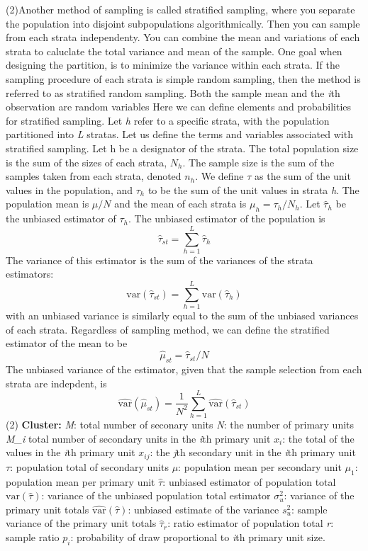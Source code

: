 \documentclass[12pt,twoside]{reedthesis}
\begin{document}
(2)Another method of sampling is called stratified sampling, where you separate the population into disjoint subpopulations algorithmically. Then you can sample from each strata independenty. You can combine the mean and variations of each strata to caluclate the total variance and mean of the sample. One goal when designing the partition, is to minimize the variance within each strata. If the sampling procedure of each strata is simple random sampling, then the method is referred to as stratified random sampling. Both the sample mean and the \emph{i}th observation are random variables
Here we can define elements and probabilities for stratified sampling. Let \emph{h} refer to a specific strata, with the population partitioned into \emph{L} stratas. Let us define the terms and variables associated with stratified sampling.
Let h be a designator of the strata. The total population size is the sum of the sizes of each strata, \(N_h\). The sample size is the sum of the samples taken from each strata, denoted \(n_h\). We define \(\tau\) as the sum of the unit values in the population, and \(\tau_h\) to be the sum of the unit values in strata \emph{h}. The population mean is \(\mu/N\) and the mean of each strata is \(\mu_h = \tau_h/N_h\).
Let \(\hat{\tau}_h\) be the unbiased estimator of \(\tau_h\). The unbiased estimator of the population is
\[ \hat{\tau}_{st} = \sum^L_{h=1}\hat{\tau}_h \]
The variance of this estimator is the sum of the variances of the strata estimators:
\[
\text{var}\left(\hat{\tau}_{st}\right) = \sum^L_{h=1}\text{var}\left(\hat{\tau}_h\right)
\]
with an unbiased variance is similarly equal to the sum of the unbiased variances of each strata.
Regardless of sampling method, we can define the stratified estimator of the mean to be
\[
\hat{\mu}_{st} = \hat{\tau}_{st}/N
\]
The unbiased variance of the estimator, given that the sample selection from each strata are indepdent, is
\[
\widehat{\text{var}} \left( \hat{\mu}_{st} \right) = \frac{1}{N^2} \sum^L_{h=1} \hat{\text{var}} \left(\hat{\tau}_{st}\right)
\]
(2)
\textbf{Cluster:}
\emph{M}: total number of seconary units
\emph{N}: the number of primary units
\emph{M\_i} total number of secondary units in the \emph{i}th primary unit
\(x_i\): the total of the values in the \emph{i}th primary unit
\(x_{ij}\): the \emph{j}th secondary unit in the \emph{i}th primary unit
\(\tau\): population total of secondary units
\(\mu\): population mean per secondary unit
\(\mu_1\): population mean per primary unit
\(\hat{\tau}\): unbiased estimator of population total
\(\text{var}(\hat{\tau})\): variance of the unbiased population total estimator
\(\sigma^2_u\): variance of the primary unit totals
\(\widehat{\text{var}}(\hat{\tau})\): unbiased estimate of the variance
\(s_u^2\): sample variance of the primary unit totals
\(\hat{\tau}_r\): ratio estimator of population total
\emph{r}: sample ratio
\(p_i\): probability of draw proportional to \emph{i}th primary unit size.
\end{document}
